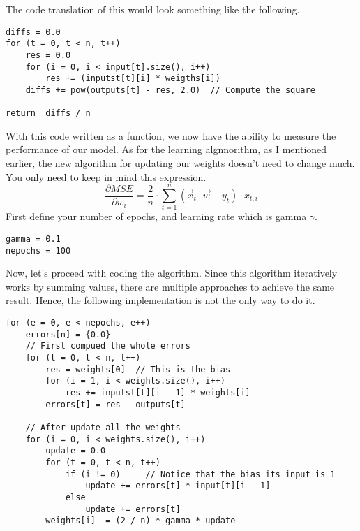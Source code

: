 The code translation of this would look something like the following.
\begin{verbatim}
diffs = 0.0
for (t = 0, t < n, t++)
    res = 0.0
    for (i = 0, i < input[t].size(), i++)
        res += (inputst[t][i] * weigths[i])
    diffs += pow(outputs[t] - res, 2.0)  // Compute the square

return  diffs / n
\end{verbatim}
With this code written as a function, we now have the ability to measure the performance of our model.
As for the learning algnnorithm, as I mentioned earlier, the new algorithm for updating our weights doesn't
need to change much. You only need to keep in mind this expression.
\[
\frac{\partial MSE}{\partial w_i} = \frac{2}{n} \cdot \sum_{t = 1}^n(\vec{x}_t \cdot \vec{w} - y_t) \cdot x_{t, i}
\]
First define your number of epochs, and learning rate which is gamma $\gamma$.
\begin{verbatim}
gamma = 0.1
nepochs = 100
\end{verbatim}
Now, let's proceed with coding the algorithm. Since this algorithm iteratively works by summing values,
there are multiple approaches to achieve the same result. Hence, the following implementation is not the
only way to do it.
\begin{verbatim}
for (e = 0, e < nepochs, e++)
    errors[n] = {0.0}
    // First compued the whole errors
    for (t = 0, t < n, t++)
        res = weights[0]  // This is the bias
        for (i = 1, i < weights.size(), i++)
            res += inputst[t][i - 1] * weights[i]
        errors[t] = res - outputs[t]

    // After update all the weights
    for (i = 0, i < weights.size(), i++)
        update = 0.0
        for (t = 0, t < n, t++)
            if (i != 0)     // Notice that the bias its input is 1
                update += errors[t] * input[t][i - 1]
            else
                update += errors[t]
        weights[i] -= (2 / n) * gamma * update
\end{verbatim}

